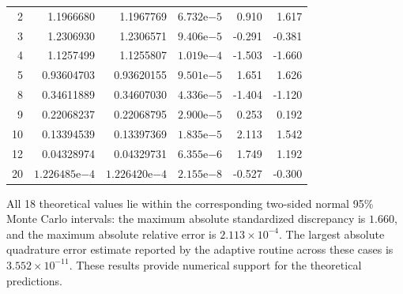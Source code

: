 \documentclass[a4paper,fleqn]{cas-dc}
\theoremstyle{definition}
\theoremstyle{remark}
\newcommand{\R}{\mathds{R}}
\newcommand{\norm}[1]{\left\lVert #1\right\rVert}
\newcommand{\0}{\mathbf{0}}
\begin{document}
\begin{table}[pos=htbp]
\begin{minipage}[t]{0.495\linewidth}
\begin{tabular}{@{}rrrrrr@{}}
\midrule
 2 & 1.1966680  & 1.1967769  & $6.732\mathrm{e}{-5}$ &  0.910 &  1.617\\
 3 & 1.2306930  & 1.2306571  & $9.406\mathrm{e}{-5}$ & -0.291 & -0.381\\
 4 & 1.1257499  & 1.1255807  & $1.019\mathrm{e}{-4}$ & -1.503 & -1.660\\
 5 & 0.93604703 & 0.93620155 & $9.501\mathrm{e}{-5}$ &  1.651 &  1.626\\
 8 & 0.34611889 & 0.34607030 & $4.336\mathrm{e}{-5}$ & -1.404 & -1.120\\
 9 & 0.22068237 & 0.22068795 & $2.900\mathrm{e}{-5}$ &  0.253 &  0.192\\
10 & 0.13394539 & 0.13397369 & $1.835\mathrm{e}{-5}$ &  2.113 &  1.542\\
12 & 0.04328974 & 0.04329731 & $6.355\mathrm{e}{-6}$ &  1.749 &  1.192\\
20 & $1.226485\mathrm{e}{-4}$ & $1.226420\mathrm{e}{-4}$ & $2.155\mathrm{e}{-8}$ & -0.527 & -0.300\\
\bottomrule
\end{tabular}
\end{minipage}
\endgroup
\end{table}

All 18 theoretical values lie within the corresponding two-sided normal
95\% Monte Carlo intervals: the maximum absolute standardized discrepancy is
$1.660$, and the maximum absolute relative error is
$2.113\times10^{-4}$. The largest absolute quadrature error estimate reported
by the adaptive routine across these cases is $3.552\times10^{-11}$. 
These results provide numerical support for the theoretical predictions.  


\end{document}
